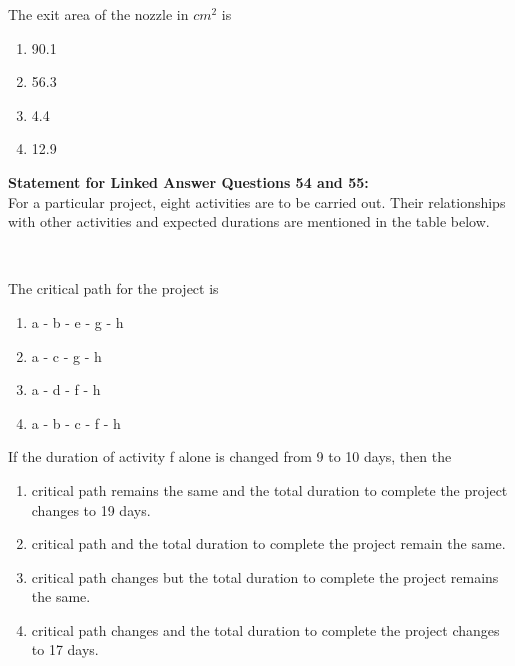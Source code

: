 \iffalse
\chapter{2012}
\author{AI24BTECH11009}
\section{me}
\fi

\item The exit area of the nozzle in $cm^2$ is 
    \begin{enumerate}
      \item 90.1
      \item 56.3
      \item 4.4
      \item 12.9 \\
    \end{enumerate}
\textbf{Statement for Linked Answer Questions 54 and 55:}\\
For a particular project, eight activities are to be carried out. Their relationships with other activities and expected durations are mentioned in the table below. 
\begin{table}[h!]
  \centering
  
\end{table}\\
\item The critical path for the project is 
\begin{enumerate}
    \item a - b - e - g - h
    \item a - c - g - h
    \item a - d - f - h
    \item a - b - c - f - h \\
\end{enumerate}
\item If the duration of activity f alone is changed from 9 to 10 days, then the
\begin{enumerate}
    \item critical path remains the same and the total duration to complete the project changes to 19 days.
    \item critical path and the total duration to complete the project remain the same.
    \item critical path changes but the total duration to complete the project remains the same.
    \item critical path changes and the total duration to complete the project changes to 17 days. \\
\end{enumerate}
